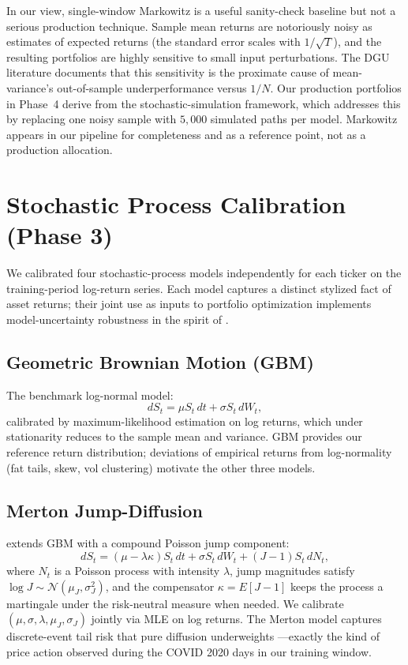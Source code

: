 \documentclass[11pt,letterpaper]{article}
\begin{document}
In our view, single-window Markowitz is a useful sanity-check baseline but not a serious production technique. Sample mean returns are notoriously noisy as estimates of expected returns (the standard error scales with $1/\sqrt{T}$), and the resulting portfolios are highly sensitive to small input perturbations. The DGU literature \citep{demiguel2009optimal} documents that this sensitivity is the proximate cause of mean-variance's out-of-sample underperformance versus $1/N$. Our production portfolios in Phase~4 derive from the stochastic-simulation framework, which addresses this by replacing one noisy sample with $5{,}000$ simulated paths per model. Markowitz appears in our pipeline for completeness and as a reference point, not as a production allocation.

\section{Stochastic Process Calibration (Phase 3)}

We calibrated four stochastic-process models independently for each ticker on the training-period log-return series. Each model captures a distinct stylized fact of asset returns; their joint use as inputs to portfolio optimization implements model-uncertainty robustness in the spirit of \citet{bental2009robust}.

\subsection{Geometric Brownian Motion (GBM)}
The benchmark log-normal model:
\begin{equation}
dS_t = \mu S_t\, dt + \sigma S_t\, dW_t,
\end{equation}
calibrated by maximum-likelihood estimation on log returns, which under stationarity reduces to the sample mean and variance. GBM provides our reference return distribution; deviations of empirical returns from log-normality (fat tails, skew, vol clustering) motivate the other three models.

\subsection{Merton Jump-Diffusion}
\citet{merton1976option} extends GBM with a compound Poisson jump component:
\begin{equation}
dS_t = (\mu - \lambda \kappa) S_t\, dt + \sigma S_t\, dW_t + (J - 1) S_t\, dN_t,
\end{equation}
where $N_t$ is a Poisson process with intensity $\lambda$, jump magnitudes satisfy $\log J \sim \mathcal{N}(\mu_J, \sigma_J^2)$, and the compensator $\kappa = E[J-1]$ keeps the process a martingale under the risk-neutral measure when needed. We calibrate $(\mu, \sigma, \lambda, \mu_J, \sigma_J)$ jointly via MLE on log returns. The Merton model captures discrete-event tail risk that pure diffusion underweights —exactly the kind of price action observed during the COVID 2020 days in our training window.
\end{document}
